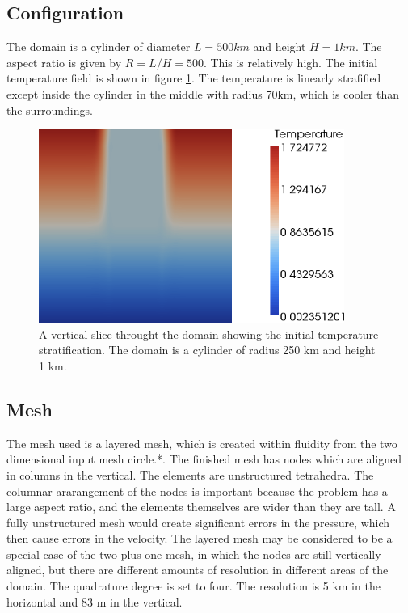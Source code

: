 \subsection{Configuration}

The domain is a cylinder of diameter $L=500\unit{km}$ and height $H=1\unit{km}$. The aspect ratio is given by $R=L/H=500$. This is relatively high.  The initial temperature field is shown in figure \ref{fig:rousset-init}. The temperature is linearly strafified except inside the cylinder in the middle with radius 70km, which is cooler than the surroundings. 

\begin{figure}[h]
\begin{center}
\includegraphics[width=10cm]{examples_images/restratification_after_oodc/rousset-init.png}
\caption{A vertical slice throught the domain showing the initial temperature stratification. The domain is a cylinder of radius 250 km and height 1 km. }
\label{fig:rousset-init}
\end{center}
\end{figure}

\subsection{Mesh}

The mesh used is a layered mesh, which is created within fluidity from the two dimensional input mesh circle.*. The finished mesh has nodes which are aligned in columns in the vertical. The elements are unstructured tetrahedra. The columnar ararangement of the nodes is important because the problem has a large aspect ratio, and the elements themselves are wider than they are tall. A fully unstructured mesh would create significant errors in the pressure, which then cause errors in the velocity. The layered mesh may be considered to be a special case of the two plus one mesh, in which the nodes are still vertically aligned, but there are different amounts of resolution in different areas of the domain. The quadrature degree is set to four. The resolution is 5 km in the horizontal and 83 m in the vertical. 


